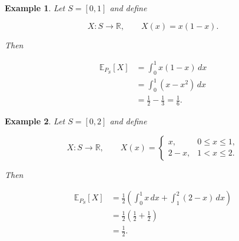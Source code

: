 \documentclass[10pt,a4paper]{book}
\newtheorem{example}{Example}[section]
\begin{document}
\begin{example}

    Let $S=[0,1]$ and define

    $$
        X:S\to\mathbb R,
        \qquad
        X(x)=x(1-x).
    $$

    Then

    $$
        \begin{aligned}
            \mathbb E_{P_S}[X]
             & =
            \int_0^1x(1-x)\,dx  \\
             & =
            \int_0^1(x-x^2)\,dx \\
             & =
            \frac12-\frac13
            =
            \frac16.
        \end{aligned}
    $$

\end{example}

\begin{example}

    Let $S=[0,2]$ and define

    $$
        X:S\to\mathbb R,
        \qquad
        X(x)=
        \begin{cases}
            x,   & 0\leq x\leq1, \\
            2-x, & 1<x\leq2.
        \end{cases}
    $$

    Then

    $$
        \begin{aligned}
            \mathbb E_{P_S}[X]
             & =
            \frac12
            \left(
            \int_0^1x\,dx
            +
            \int_1^2(2-x)\,dx
            \right) \\
             & =
            \frac12
            \left(
            \frac12+\frac12
            \right) \\
             & =
            \frac12.
        \end{aligned}
    $$

\end{example}
\end{document}
